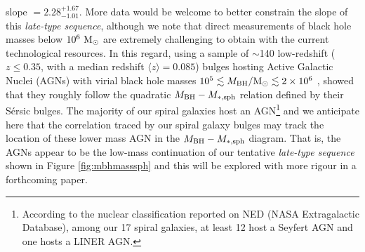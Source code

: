 \documentclass[preprint2]{emulateapj}
\begin{document}
slope $= 2.28^{+1.67}_{-1.01}$.
More data would be welcome to better constrain the slope of this \emph{late-type sequence}, 
although we note that direct measurements of black hole masses below $10^6\rm~M_\odot$ are extremely challenging to obtain 
with the current technological resources. 
In this regard, using a sample of $\sim$140 low-redshift ($z \leq 0.35$, with a median redshift $\langle z \rangle = 0.085$) 
bulges hosting Active Galactic Nuclei (AGNs) with virial
black hole masses $10^5 \lesssim M_{\rm BH}/{\rm M_\odot} \lesssim 2 \times 10^6$ \citep{jiang2011a}, 
\cite{grahamscott2015} showed that they roughly follow the quadratic $M_{\rm BH} - M_{\rm *,sph}$ relation defined by their S\'ersic bulges.
The majority of our spiral galaxies host an AGN\footnote{According to the nuclear classification reported on NED 
(NASA Extragalactic Database), among our 17 spiral galaxies, at least 12 host a Seyfert AGN and one hosts a LINER AGN.} and
we anticipate here that the correlation traced by our spiral galaxy bulges 
may track the location of these lower mass AGN in the $M_{\rm BH} - M_{\rm *,sph}$ diagram.
That is, the AGNs appear to be the low-mass continuation of our tentative \emph{late-type sequence} shown in Figure \ref{fig:mbhmasssph} 
and this will be explored with more rigour in a forthcoming paper. 
 
\end{document}
